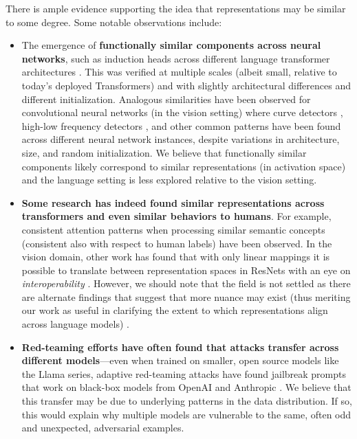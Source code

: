 \documentclass[9pt,letterpaper]{article}
\begin{document}
There is ample evidence supporting the idea that representations may be similar to some degree. Some notable observations include:
\begin{itemize}
    \item The emergence of \textbf{functionally similar components across neural networks}, such as induction heads across different language transformer architectures \cite{olsson2022context}. This was verified at multiple scales (albeit small, relative to today's deployed Transformers) and with slightly architectural differences and different initialization. Analogous similarities have been observed for convolutional neural networks (in the vision setting) where curve detectors \cite{cammarata_curve_2020}, high-low frequency detectors \cite{schubert2021high-low}, and other common patterns \cite{olah2020zoom} have been found across different neural network instances, despite variations in architecture, size, and random initialization. We believe that functionally similar components likely correspond to similar representations (in activation space) and the language setting is less explored relative to the vision setting.
    \item \textbf{Some research has indeed found similar representations across transformers and even similar behaviors to humans}. For example, consistent attention patterns when processing similar semantic concepts \cite{eberle-etal-2022-transformer} (consistent also with respect to human labels) have been observed. In the vision domain, other work has found that with only linear mappings it is possible to translate between representation spaces in ResNets with an eye on \textit{interoperability} \cite{hernandez_model_2023} \cite{bansal_revisiting_2021}. However, we should note that the field is not settled as there are alternate findings that suggest that more nuance may exist (thus meriting our work as useful in clarifying the extent to which representations align across language models) \cite{Klabunde2023TowardsMR}.
    \item \textbf{Red-teaming efforts have often found that attacks transfer across different models}---even when trained on smaller, open source models like the Llama series, adaptive red-teaming attacks have found jailbreak prompts that work on black-box models from OpenAI and Anthropic \cite{zou_universal_2023} \cite{andriushchenko_jailbreaking_2024} \cite{chao_jailbreaking_2024} \cite{mehrotra_tree_2024}. We believe that this transfer may be due to underlying patterns in the data distribution. If so, this would explain why multiple models are vulnerable to the same, often odd and unexpected, adversarial examples.
\end{itemize}
\end{document}
